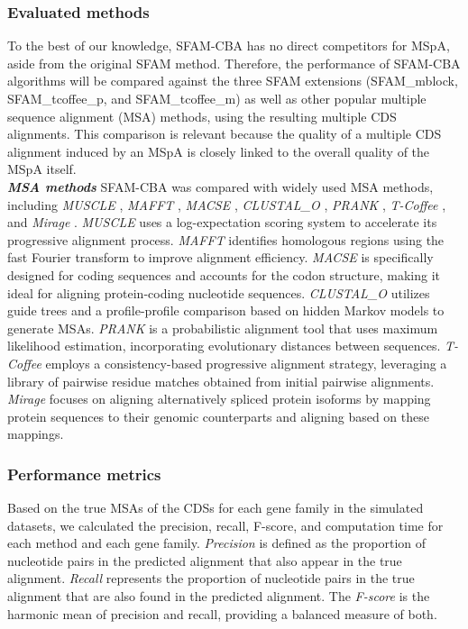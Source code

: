 \documentclass[12pt,oneside,letterpaper,english]{article}
\begin{document}
\subsubsection{Evaluated methods}
To the best of our knowledge, SFAM-CBA has no direct competitors for MSpA, aside from the original SFAM method. Therefore, 
the performance of SFAM-CBA algorithms will be compared against the three SFAM extensions (SFAM\_mblock, SFAM\_tcoffee\_p, and SFAM\_tcoffee\_m) 
as well as other popular multiple sequence alignment (MSA) methods, using the resulting multiple CDS alignments. This comparison 
is relevant because the quality of a multiple CDS alignment induced by an MSpA is closely linked to the overall quality of the MSpA itself. \\
    

\noindent \textbf{\textit{MSA methods}} SFAM-CBA was compared with widely used MSA methods, including \textit{MUSCLE} \citep{edgar2004}, 
\textit{MAFFT} \citep{katoh2013}, \textit{MACSE} \citep{ranwez2018}, \textit{CLUSTAL\_O} \citep{sievers2011}, \textit{PRANK} 
\citep{loytynoja2005, loytynoja2008}, \textit{T-Coffee} \citep{notredame2000}, and \textit{Mirage} \citep{nord2018}. \textit{MUSCLE} 
uses a log-expectation scoring system to accelerate its progressive alignment process. \textit{MAFFT} identifies homologous regions 
using the fast Fourier transform to improve alignment efficiency. \textit{MACSE} is specifically designed for coding sequences and 
accounts for the codon structure, making it ideal for aligning protein-coding nucleotide sequences. \textit{CLUSTAL\_O} utilizes 
guide trees and a profile-profile comparison based on hidden Markov models to generate MSAs. \textit{PRANK} is a probabilistic 
alignment tool that uses maximum likelihood estimation, incorporating evolutionary distances between sequences. \textit{T-Coffee} 
employs a consistency-based progressive alignment strategy, leveraging a library of pairwise residue matches obtained from initial 
pairwise alignments. \textit{Mirage} focuses on aligning alternatively spliced protein isoforms by mapping protein sequences to their 
genomic counterparts and aligning based on these mappings.

\subsubsection{Performance metrics}
Based on the true MSAs of the CDSs for each gene family in the simulated datasets, we calculated the precision, recall, F-score, 
and computation time for each method and each gene family. \textit{Precision} is defined as the proportion of nucleotide pairs in the predicted 
alignment that also appear in the true alignment. \textit{Recall} represents the proportion of nucleotide pairs in the true alignment that are also 
found in the predicted alignment. The \textit{F-score} is the harmonic mean of precision and recall, providing a balanced measure of both.
\end{document}
